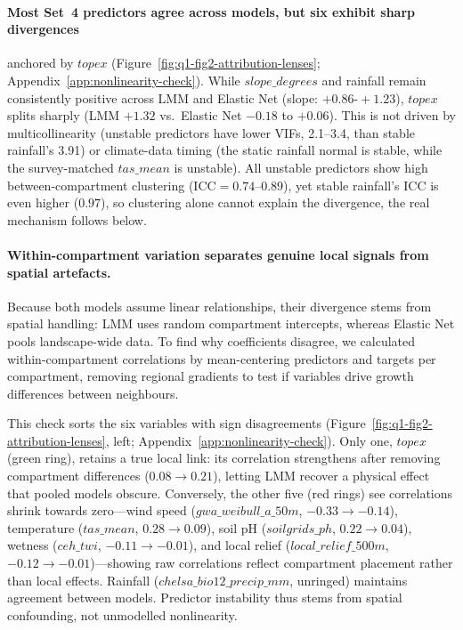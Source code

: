\documentclass[logo,msc,ai]{infthesis}           %
\begin{document}
\paragraph*{Most Set~4 predictors agree across models, but six exhibit sharp divergences} anchored by $\mathit{topex}$ (Figure~\ref{fig:q1-fig2-attribution-lenses}; Appendix~\ref{app:nonlinearity-check}). While $\mathit{slope\_degrees}$ and rainfall remain consistently positive across LMM and Elastic Net (slope: $+0.86\text{-}+1.23$), $\mathit{topex}$ splits sharply (LMM $+1.32$ vs.\ Elastic Net $-0.18$ to $+0.06$). This is not driven by multicollinearity (unstable predictors have lower VIFs, 2.1--3.4, than stable rainfall's 3.91) or climate-data timing (the static rainfall normal is stable, while the survey-matched $\mathit{tas\_mean}$ is unstable). All unstable predictors show high between-compartment clustering ($\text{ICC} = 0.74$--$0.89$), yet stable rainfall's ICC is even higher ($0.97$), so clustering alone cannot explain the divergence, the real mechanism follows below.

\paragraph*{Within-compartment variation separates genuine local signals from spatial artefacts.}
Because both models assume linear relationships, their divergence stems from spatial handling: LMM uses random compartment intercepts, whereas Elastic Net pools landscape-wide data. To find why coefficients disagree, we calculated within-compartment correlations by mean-centering predictors and targets per compartment, removing regional gradients to test if variables drive growth differences between neighbours.

This check sorts the six variables with sign disagreements (Figure~\ref{fig:q1-fig2-attribution-lenses}, left; Appendix~\ref{app:nonlinearity-check}). Only one, $\mathit{topex}$ (green ring), retains a true local link: its correlation strengthens after removing compartment differences ($0.08 \to 0.21$), letting LMM recover a physical effect that pooled models obscure. Conversely, the other five (red rings) see correlations shrink towards zero—wind speed ($\mathit{gwa\_weibull\_a\_50m}$, $-0.33 \to -0.14$), temperature ($\mathit{tas\_mean}$, $0.28 \to 0.09$), soil pH ($\mathit{soilgrids\_ph}$, $0.22 \to 0.04$), wetness ($\mathit{ceh\_twi}$, $-0.11 \to -0.01$), and local relief ($\mathit{local\_relief\_500m}$, $-0.12 \to -0.01$)—showing raw correlations reflect compartment placement rather than local effects. Rainfall ($\mathit{chelsa\_bio12\_precip\_mm}$, unringed) maintains agreement between models. Predictor instability thus stems from spatial confounding, not unmodelled nonlinearity.
\end{document}
